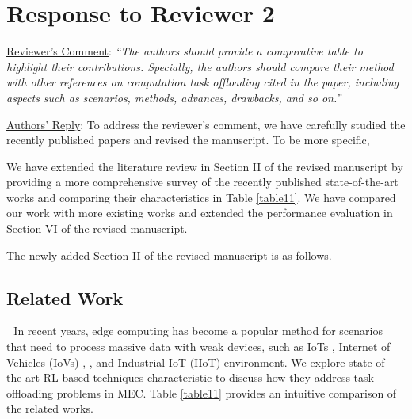 \documentclass[12pt,draftclsnofoot,onecolumn]{IEEEtran}
\newcommand{\rev}[1]{{\color{blue}#1}} %
\newcommand{\rev}[1]{#1}
\newenvironment{my}[2]%
{\begin{list}{}%
{\setlength{\rightmargin}{#1}\setlength{\leftmargin}{#2}}%


 \item[]{}

} {\end{list}}
\begin{document}
\section{Response to Reviewer 2}
\begin{enumerate}
	
	\item \underline{Reviewer's Comment}: 
	\textit{``The authors should provide a comparative table to highlight their contributions. Specially, the authors should compare their method with other references on computation task offloading cited in the paper, including aspects such as scenarios, methods, advances, drawbacks, and so on.''} \newline

	\underline{Authors' Reply}: To address the reviewer's comment, we have carefully studied the recently published papers and revised the manuscript. 
	To be more specific,

		We have extended the literature review in Section II of the revised manuscript by providing a more comprehensive survey of the recently published state-of-the-art works and comparing their characteristics in Table \ref{table11}.
		We have compared our work with more existing works and extended the performance evaluation in Section VI of the revised manuscript. 


\vspace{6mm}
 The newly added Section II of the revised manuscript is as follows. 
	

	
	
		\setcounter{section}{1}
	
\begin{my}{1cm}{1cm}
	\rev{
		\section{Related Work}
		\label{section:II}
		\,\,\,\,In recent years, edge computing has become a popular method for scenarios that need to process massive data with weak devices, such as IoTs \cite{zhang2023multi}, Internet of Vehicles (IoVs) \cite{lin2022multi}, \cite{wei2023many}, and Industrial IoT (IIoT) \cite{yuan2023adaptive} environment.
		We explore state-of-the-art RL-based techniques characteristic to discuss how they address task offloading problems in MEC. Table \ref{table11} provides an intuitive comparison of the related works.
}
\end{my}
\end{enumerate}
\end{document}

